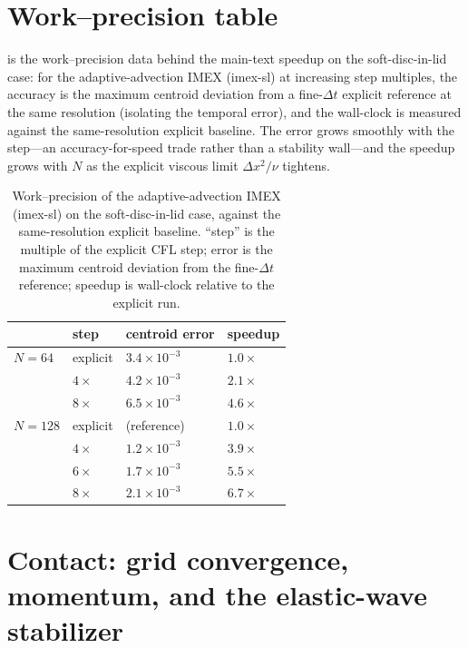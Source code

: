 \documentclass[final,3p,times]{elsarticle}
\newcommand{\dt}{\Delta t}
\newcommand{\dx}{\Delta x}
\begin{document}
\section{Work--precision table}
\label{sec:supp-workprec}
 is the work--precision data behind the main-text speedup on the soft-disc-in-lid
case: for the adaptive-advection IMEX (imex-sl) at increasing step multiples, the accuracy is the
maximum centroid deviation from a fine-$\dt$ explicit reference at the same resolution
(isolating the temporal error), and the wall-clock is measured against the same-resolution explicit
baseline. The error grows smoothly with the step---an accuracy-for-speed trade rather than a
stability wall---and the speedup grows with $N$ as the explicit viscous limit $\dx^2/\nu$ tightens.

\begin{table}[t]\centering\small
\caption{Work--precision of the adaptive-advection IMEX (imex-sl) on the soft-disc-in-lid case,
against the same-resolution explicit baseline. ``step'' is the multiple of the explicit CFL step;
error is the maximum centroid deviation from the fine-$\dt$ reference; speedup is wall-clock relative
to the explicit run.}
\label{tab:workprec}
\begin{tabular}{@{}llll@{}}
\toprule
 & step & centroid error & speedup \\
\midrule
$N{=}64$  & explicit & $3.4\times10^{-3}$ & $1.0\times$ \\
          & $4\times$ & $4.2\times10^{-3}$ & $2.1\times$ \\
          & $8\times$ & $6.5\times10^{-3}$ & $4.6\times$ \\
\midrule
$N{=}128$ & explicit & (reference) & $1.0\times$ \\
          & $4\times$ & $1.2\times10^{-3}$ & $3.9\times$ \\
          & $6\times$ & $1.7\times10^{-3}$ & $5.5\times$ \\
          & $8\times$ & $2.1\times10^{-3}$ & $6.7\times$ \\
\bottomrule
\end{tabular}
\end{table}

\section{Contact: grid convergence, momentum, and the elastic-wave stabilizer}
\label{sec:supp-stabilizer}
\end{document}
